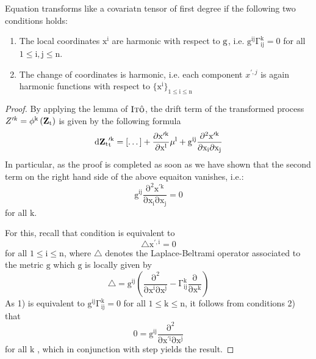 \documentclass[11pt,english]{smfart}
\newcommand{\Z}{{\bf{Z}_{\textrm{t}}}}
\newcommand{\g}{{\textrm{g}}}
\begin{document}
\begin{lemm} Equation transforms like a covariatn tensor of first degree if the following two conditions holds:
\begin{enumerate}
\item The local coordinates $\mathrm{x^{i}}$ are harmonic with respect to $\textrm{\g}$, i.e. $\mathrm{g^{ij}\Gamma^{k}_{ij}=0}$ for all $\mathrm{1 \leq i,j\leq n}$.
\item The change of coordinates is harmonic, i.e. each component $x^{\prime,j}$ is again harmonic functions with respect to $\mathrm{\{x^{i}\}_{1\leq i\leq n}}$
\end{enumerate}
\end{lemm}
\begin{proof} By applying the lemma of $\textsc{Itô}$, the drift term of the transformed process $Z^{\prime k}=\mathrm{\phi^{k}\left(\Z\right)}$ is given by the following formula
\begin{equation}
\mathrm{d\Z^{\prime k}_{t}= [\dots] + \frac{\partial x^{\prime k}}{\partial x^{l}}\mu^{l}+g^{ij}\frac{\partial^2 x^{\prime k}}{\partial x_{i}\partial x_j}}
\end{equation} In particular, as the proof is completed  as soon as we have shown that the second term on the right hand side of the above equaiton vanishes, i.e.:
\begin{equation}
\mathrm{g^{ij}\frac{\partial^2 x^{\prime k}}{\partial x_{i}\partial x_j}= 0}
\end{equation} for all $\mathrm{k}$.

For this, recall that condition is equivalent to
\begin{equation}
\mathrm{\triangle x^{\prime,i}= 0}
\end{equation} for all $\mathrm{1 \leq i\leq n}$, where $\mathrm{\triangle}$ denotes the Laplace-Beltrami operator associated to the metric $\mathrm{g}$ which $\mathrm{g}$ is locally given by 
\begin{equation}
\mathrm{\triangle = g^{ij}\left(\frac{\partial^{2}}{\partial x^{i}\partial x^{j}}- \Gamma^{k}_{ij}\frac {\partial}{\partial x^{k}}\right)}
\end{equation} As 1) is equivalent to $\mathrm{\mathrm{g^{ij}\Gamma^{k}_{ij}}=0}$ for all $\mathrm{1 \leq k \leq n}$, it follows from conditions 2) that
\begin{equation}
\mathrm{0 = g^{ij}\frac{\partial^{2}}{\partial x^{\prime i}\partial x^{j}}}
\end{equation} for all $\mathrm{k}$ , which in conjunction with step yields the result.
\end{proof}
\end{document}
